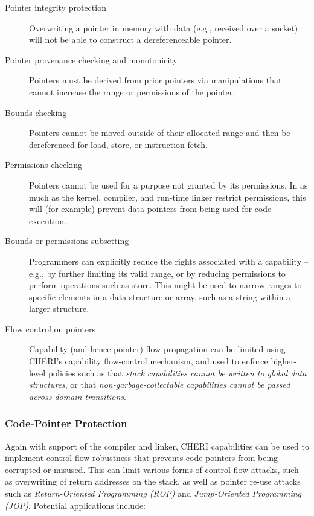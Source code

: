 \begin{description}
\item[Pointer integrity protection] Overwriting a pointer in memory with data
  (e.g., received over a socket) will not be able to construct a
  dereferenceable pointer.

\item[Pointer provenance checking and monotonicity] Pointers must be derived
  from prior pointers via manipulations that cannot increase the range or
  permissions of the pointer.

\item[Bounds checking] Pointers cannot be moved outside of their allocated
  range and then be dereferenced for load, store, or instruction fetch.

\item[Permissions checking] Pointers cannot be used for a purpose not granted
  by its permissions.
  In as much as the kernel, compiler, and run-time linker restrict
  permissions, this will (for example) prevent data pointers from being used
  for code execution.

\item[Bounds or permissions subsetting] Programmers can explicitly reduce the
  rights associated with a capability -- e.g., by further limiting its valid
  range, or by reducing permissions to perform operations such as store.
  This might be used to narrow ranges to specific elements in a data structure
  or array, such as a string within a larger structure.

\item[Flow control on pointers] Capability (and hence pointer) flow
  propagation can be limited using CHERI's capability flow-control
  mechanism, and used to enforce higher-level policies such as that
\textit{stack capabilities cannot be written to global data structures}, or
  that \textit{non-garbage-collectable capabilities cannot be passed across
  domain transitions}.
\end{description}

\subsubsection{Code-Pointer Protection}

Again with support of the compiler and linker, CHERI capabilities can be used
to implement control-flow robustness that prevents code pointers from being
corrupted or misused.
This can limit various forms of control-flow attacks, such as overwriting
of return addresses on the stack, as well as pointer re-use attacks such as
\textit{Return-Oriented Programming (ROP)} and \textit{Jump-Oriented
Programming (JOP)}.
Potential applications include:

